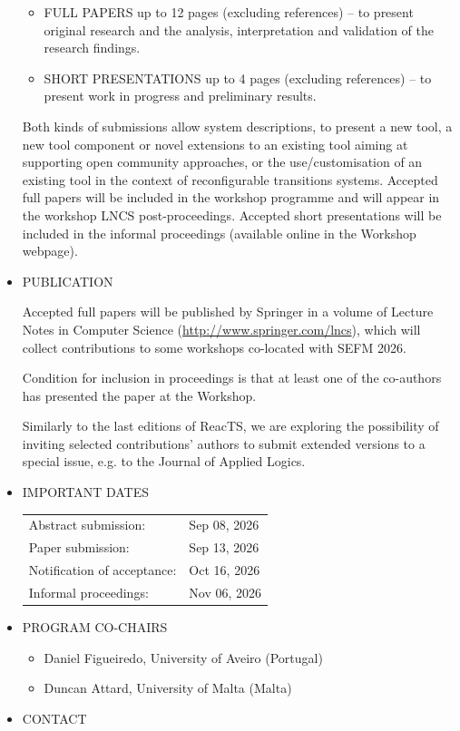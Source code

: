 \documentclass[prodmode,acmtecs]{acmsmall} %
\begin{document}
\begin{itemize}
\begin{itemize}\item  FULL PAPERS up to 12 pages (excluding references) – to present original research and the analysis, interpretation and validation of the research findings.
\item  SHORT PRESENTATIONS up to 4 pages (excluding references) – to present work in progress and preliminary results.
\end{itemize} 
  Both kinds of submissions allow system descriptions, to present a new tool, a new tool component or novel extensions to an existing tool aiming at supporting open community approaches, or the use/customisation of an existing tool in the context of reconfigurable transitions systems. Accepted full papers will be included in the workshop programme and will appear in the workshop LNCS post-proceedings. Accepted short presentations will be included in the informal proceedings (available online in the Workshop webpage). 
 
\item  PUBLICATION 
 
  Accepted full papers will be published by Springer in a volume of Lecture Notes in Computer Science (\href{http://www.springer.com/lncs}{http://www.springer.com/lncs}), which will collect contributions to some workshops co-located with SEFM 2026. 
 
  Condition for inclusion in proceedings is that at least one of the co-authors has presented the paper at the Workshop. 
 
  Similarly to the last editions of ReacTS, we are exploring the possibility of inviting selected contributions' authors to submit extended versions to a special issue, e.g. to the Journal of Applied Logics. 
 
\item  IMPORTANT DATES 
 
\begin{tabulary}{\linewidth}{LL}Abstract submission:  & Sep 08, 2026 \\
Paper submission:  & Sep 13, 2026 \\
Notification of acceptance:  & Oct 16, 2026 \\
Informal proceedings:  & Nov 06, 2026 \\
\end{tabulary}
 
\item  PROGRAM CO-CHAIRS 
 
\begin{itemize}\item  Daniel Figueiredo, University of Aveiro (Portugal)
\item  Duncan Attard, University of Malta (Malta)
\end{itemize} 
\item  CONTACT 
 

\end{itemize}
\end{document}
